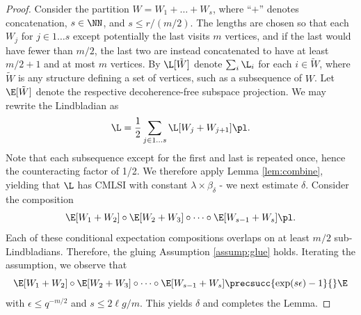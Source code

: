 \begin{proof}
    Consider the partition $W = W_1 +  \dots + W_s$, where ``$+$'' denotes concatenation, $s \in \NN$, and $s \leq r / (m/2)$. The lengths are chosen so that each $W_j$ for $j \in 1 \dots s$ except potentially the last visits $m$ vertices, and if the last would have fewer than $m/2$, the last two are instead concatenated to have at least $m/2+1$ and at most $m$ vertices. By $\L[\tilde{W}]$ denote $\sum_i \L_i$ for each $i \in \tilde{W}$, where $\tilde{W}$ is any structure defining a set of vertices, such as a subsequence of $W$. Let $\E[\tilde{W}]$ denote the respective decoherence-free subspace projection. We may rewrite the Lindbladian as
    \begin{equation} \label{eq:lindblad-repeat}
        \L = \frac{1}{2} \sum_{j \in 1 \dots s} \L[W_j + W_{j+1}] \pl.
    \end{equation}
    Note that each subsequence except for the first and last is repeated once, hence the counteracting factor of 1/2. We therefore apply Lemma \ref{lem:combine}, yielding that $\L$ has CMLSI with constant $\lambda \times \beta_\delta$ - we next estimate $\delta$. Consider the composition
    \begin{equation}
        \E[W_1 + W_2] \circ \E[W_2 + W_3] \circ \dots \circ \E[W_{s-1} + W_s] \pl.
    \end{equation}
    Each of these conditional expectation compositions overlaps on at least $m/2$ sub-Lindbladians. Therefore, the gluing Assumption \ref{assump:glue} holds. Iterating the assumption, we observe that
    \begin{equation}
        \E[W_1 + W_2] \circ \E[W_2 + W_3] \circ \dots \circ \E[W_{s-1} + W_s]
            \precsucc{\exp(s \epsilon) - 1}{} \E
    \end{equation}
    with $\epsilon \leq q^{-m/2}$ and $s \leq 2 \ell g / m$. This yields $\delta$ and completes the Lemma.
\end{proof}
